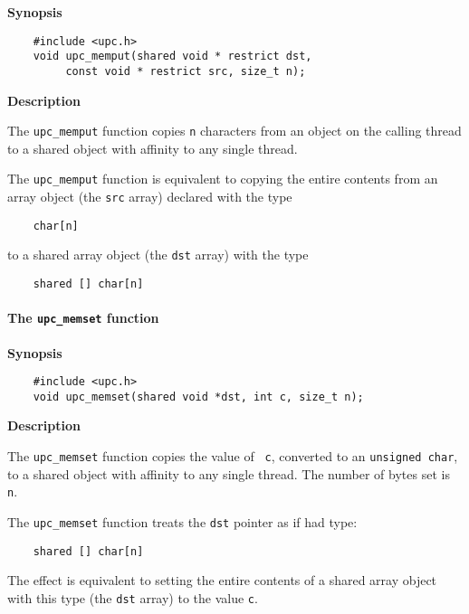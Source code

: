 {\bf Synopsis} 

\npf\vspace{-2.5em}
\begin{verbatim}
    #include <upc.h> 
    void upc_memput(shared void * restrict dst,
         const void * restrict src, size_t n); 
\end{verbatim}

{\bf Description}
 
\np The {\tt upc\_memput} function copies {\tt n} characters from
   an object on the calling thread to a shared object with affinity
   to any single thread.
   
\np The {\tt upc\_memput} function is equivalent to copying the
   entire contents from an array object (the {\tt src} array) declared
   with the type

\begin{verbatim}
    char[n] 
\end{verbatim}

   to a shared array object (the {\tt dst} array) with the type 

\begin{verbatim}
    shared [] char[n] 
\end{verbatim}

\paragraph{The {\tt upc\_memset} function}

{\bf Synopsis}

\npf\vspace{-2.5em}
\begin{verbatim}
    #include <upc.h> 
    void upc_memset(shared void *dst, int c, size_t n); 
\end{verbatim}

{\bf Description}

\np The {\tt upc\_memset} function copies the value of {\tt
   c}, converted to an {\tt unsigned char}, to a shared object with affinity
   to any single thread.  The number of bytes set is {\tt n}.

\np The {\tt upc\_memset} function treats the {\tt dst}
   pointer as if had type:

\begin{verbatim}
    shared [] char[n] 
\end{verbatim}

   The effect is equivalent to setting the entire contents of a shared
   array object with this type (the {\tt dst} array) to the value {\tt c}.

